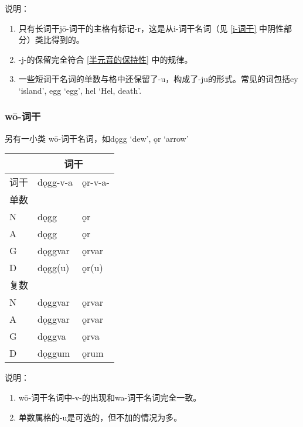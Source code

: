 说明：

\begin{enumerate}

  \item
        只有长词干jō-词干的主格有标记-r，这是从i-词干名词（见 \ref{i-词干} 中阴性部分）类比得到的。
  \item
        -j-的保留完全符合 \ref{半元音的保持性} 中的规律。
  \item
        一些短词干名词的单数与格中还保留了-u，构成了-ju的形式。常见的词包括ey
        `island', egg `egg', hel `Hel, death'.
\end{enumerate}

\subsubsection{wō-词干}

另有一小类 wō-词干名词，如dǫgg `dew', ǫr `arrow'

\begin{longtable}{lll}
  \toprule
       & \multicolumn{2}{c}{\textbf{词干}}           \\
  \midrule
  \endhead
  \bottomrule
  \endfoot
  词干 & dǫgg-v-a                          & ǫr-v-a- \\
  单数 &                                   &         \\
  N    & dǫgg                              & ǫr      \\
  A    & dǫgg                              & ǫr      \\
  G    & dǫggvar                           & ǫrvar   \\
  D    & dǫgg(u)                           & ǫr(u)   \\
  复数 &                                   &         \\
  N    & dǫggvar                           & ǫrvar   \\
  A    & dǫggvar                           & ǫrvar   \\
  G    & dǫggva                            & ǫrva    \\
  D    & dǫggum                            & ǫrum    \\
\end{longtable}

说明：

\begin{enumerate}

  \item
        wō-词干名词中-v-的出现和wa-词干名词完全一致。
  \item
        单数属格的-u是可选的，但不加的情况为多。
\end{enumerate}

